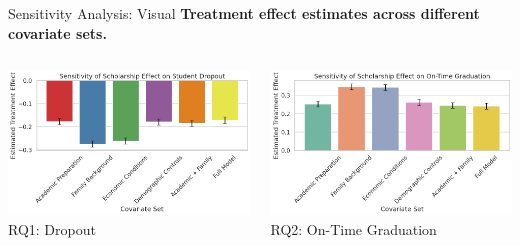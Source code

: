 \documentclass[aspectratio=169]{beamer}
\begin{document}
\begin{frame}{Sensitivity Analysis: Visual}
\textbf{Treatment effect estimates across different covariate sets.}
\vspace{5pt}

\begin{columns}
\begin{column}{0.5\textwidth}
\centering
\includegraphics[width=\linewidth]{Tex_Pictures/sensitivityrq1.png} \\
\small RQ1: Dropout
\end{column}
\begin{column}{0.5\textwidth}
\centering
\includegraphics[width=\linewidth]{Tex_Pictures/sensitivityrq2.png} \\
\small RQ2: On-Time Graduation
\end{column}
\end{columns}
\end{frame}
\end{document}
